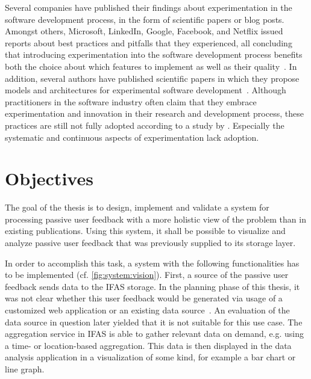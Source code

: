 Several companies have published their findings about experimentation in the software development process, in the form of scientific papers or blog posts.
Amongst others, Microsoft, LinkedIn, Google, Facebook, and Netflix issued reports about best practices and pitfalls that they experienced, all concluding that introducing experimentation into the software development process benefits both the choice about which features to implement as well as their quality~\cite{Kohavi2013,Xu2015,Tang2010,Bakshy2014,WEB:Netflix:2016}.
In addition, several authors have published scientific papers in which they propose models and architectures for experimental software development~\cite{Fagerholm2014,Fagerholm2017,Johanssen2017,Lindgren2015}.
Although practitioners in the software industry often claim that they embrace experimentation and innovation in their research and development process, these practices are still not fully adopted according to a study by \citet{lindgren2015software}.
Especially the systematic and continuous aspects of experimentation lack adoption.




\section{Objectives}
\label{sec:intro:objectives}


The goal of the thesis is to design, implement and validate a system for processing passive user feedback with a more holistic view of the problem than in existing publications.
Using this system, it shall be possible to visualize and analyze passive user feedback that was previously supplied to its storage layer.

In order to accomplish this task, a system with the following functionalities has to be implemented (cf. \cref{fig:system:vision}).
First, a source of the passive user feedback sends data to the \ac{IFAS} storage.
In the planning phase of this thesis, it was not clear whether this user feedback would be generated via usage of a customized web application or an existing data source~\cite{Deka:2017:Rico}.
An evaluation of the data source in question later yielded that it is not suitable for this use case.
The aggregation service in \ac{IFAS} is able to gather relevant data on demand, e.g. using a time- or location-based aggregation.
This data is then displayed in the data analysis application in a visualization of some kind, for example a bar chart or line graph.

